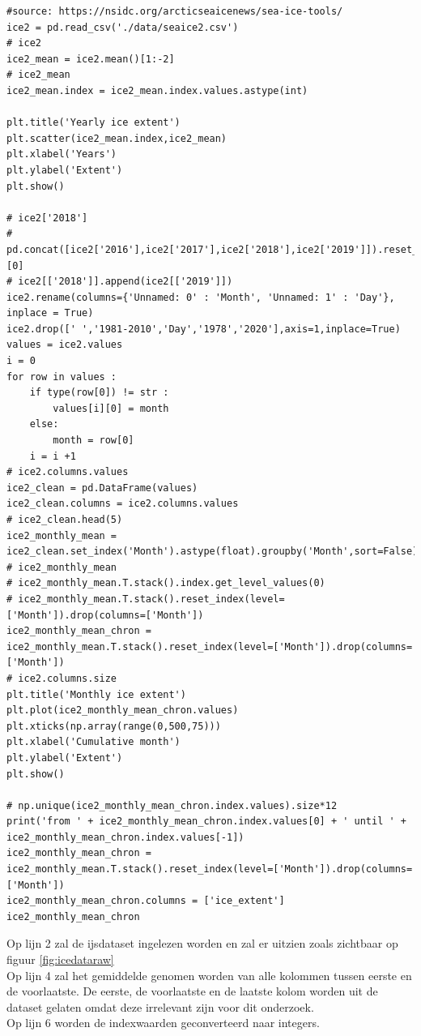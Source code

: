 \label{code:prep_ice}
\begin{verbatim}
#source: https://nsidc.org/arcticseaicenews/sea-ice-tools/
ice2 = pd.read_csv('./data/seaice2.csv')
# ice2
ice2_mean = ice2.mean()[1:-2]
# ice2_mean
ice2_mean.index = ice2_mean.index.values.astype(int)

plt.title('Yearly ice extent')
plt.scatter(ice2_mean.index,ice2_mean)
plt.xlabel('Years')
plt.ylabel('Extent')
plt.show()

# ice2['2018']
# pd.concat([ice2['2016'],ice2['2017'],ice2['2018'],ice2['2019']]).reset_index()[0]
# ice2[['2018']].append(ice2[['2019']])
ice2.rename(columns={'Unnamed: 0' : 'Month', 'Unnamed: 1' : 'Day'}, inplace = True)
ice2.drop([' ','1981-2010','Day','1978','2020'],axis=1,inplace=True)
values = ice2.values
i = 0
for row in values :
    if type(row[0]) != str :
        values[i][0] = month
    else:
        month = row[0]
    i = i +1
# ice2.columns.values
ice2_clean = pd.DataFrame(values)
ice2_clean.columns = ice2.columns.values
# ice2_clean.head(5)
ice2_monthly_mean = ice2_clean.set_index('Month').astype(float).groupby('Month',sort=False).mean()
# ice2_monthly_mean
# ice2_monthly_mean.T.stack().index.get_level_values(0)
# ice2_monthly_mean.T.stack().reset_index(level=['Month']).drop(columns=['Month'])
ice2_monthly_mean_chron = ice2_monthly_mean.T.stack().reset_index(level=['Month']).drop(columns=['Month'])
# ice2.columns.size
plt.title('Monthly ice extent')
plt.plot(ice2_monthly_mean_chron.values)
plt.xticks(np.array(range(0,500,75)))
plt.xlabel('Cumulative month')
plt.ylabel('Extent')
plt.show()

# np.unique(ice2_monthly_mean_chron.index.values).size*12
print('from ' + ice2_monthly_mean_chron.index.values[0] + ' until ' + ice2_monthly_mean_chron.index.values[-1])
ice2_monthly_mean_chron = ice2_monthly_mean.T.stack().reset_index(level=['Month']).drop(columns=['Month'])
ice2_monthly_mean_chron.columns = ['ice_extent']
ice2_monthly_mean_chron
\end{verbatim}

Op lijn 2 zal de ijsdataset ingelezen worden en zal er uitzien zoals zichtbaar op figuur \ref{fig:icedataraw} \\
Op lijn 4 zal het gemiddelde genomen worden van alle kolommen tussen eerste en de voorlaatste. De eerste, de voorlaatste en de laatste kolom worden uit de dataset gelaten omdat deze irrelevant zijn voor dit onderzoek. \\
Op lijn 6 worden de indexwaarden geconverteerd naar integers. \\

